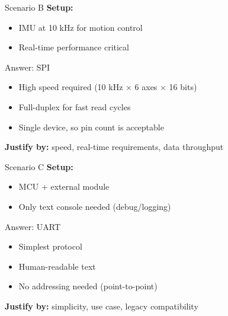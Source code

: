 \documentclass[aspectratio=169,11pt]{beamer}
\begin{document}
\begin{frame}{Scenario B}
    \textbf{Setup:}
    \begin{itemize}
        \item IMU at 10 kHz for motion control
        \item Real-time performance critical
    \end{itemize}
    
    \vspace{0.5cm}
    \pause
    \begin{block}{Answer: SPI}
        \begin{itemize}
            \item High speed required (10 kHz $\times$ 6 axes $\times$ 16 bits)
            \item Full-duplex for fast read cycles
            \item Single device, so pin count is acceptable
        \end{itemize}
    \end{block}
    
    \vspace{0.3cm}
    \textbf{Justify by:} speed, real-time requirements, data throughput
\end{frame}

\begin{frame}{Scenario C}
    \textbf{Setup:}
    \begin{itemize}
        \item MCU + external module
        \item Only text console needed (debug/logging)
    \end{itemize}
    
    \vspace{0.5cm}
    \pause
    \begin{block}{Answer: UART}
        \begin{itemize}
            \item Simplest protocol
            \item Human-readable text
            \item No addressing needed (point-to-point)
        \end{itemize}
    \end{block}
    
    \vspace{0.3cm}
    \textbf{Justify by:} simplicity, use case, legacy compatibility
\end{frame}
\end{document}

